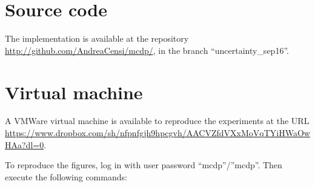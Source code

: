 \section{Source code}

The implementation is available at the repository \url{http://github.com/AndreaCensi/mcdp/},
in the branch ``uncertainty\_sep16''.


\section{Virtual machine }

A VMWare virtual machine is available to reproduce the experiments
at the URL \url{https://www.dropbox.com/sh/nfpnfgjh9hpcgvh/AACVZfdVXxMoVqTYiHWaOwHAa?dl=0}.

To reproduce the figures, log in with user password ``mcdp''/''mcdp''.
Then execute the following commands:


\clearpage


